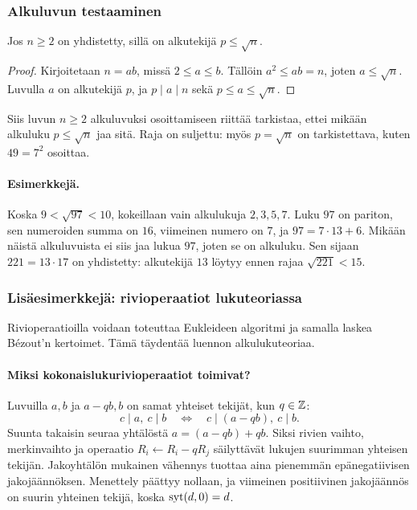 \documentclass[11pt,a4paper]{amsart}
\begin{document}
\subsubsection{Alkuluvun testaaminen}
\begin{lemma}[Neliöjuuriraja]
  Jos $n\ge2$ on yhdistetty, sillä on alkutekijä $p\le\sqrt n$.
\end{lemma}
\begin{proof}
  Kirjoitetaan $n=ab$, missä $2\le a\le b$. Tällöin $a^2\le ab=n$,
  joten $a\le\sqrt n$. Luvulla $a$ on alkutekijä $p$, ja
  $p\mid a\mid n$ sekä $p\le a\le\sqrt n$.
\end{proof}
Siis luvun $n\ge2$ alkuluvuksi osoittamiseen riittää tarkistaa,
ettei mikään alkuluku $p\le\sqrt n$ jaa sitä. Raja on suljettu:
myös $p=\sqrt n$ on tarkistettava, kuten $49=7^2$ osoittaa.

\paragraph{Esimerkkejä.}
Koska $9<\sqrt{97}<10$, kokeillaan vain alkulukuja $2,3,5,7$.
Luku $97$ on pariton, sen numeroiden summa on $16$, viimeinen numero
on $7$, ja $97=7\cdot13+6$. Mikään näistä alkuluvuista ei siis jaa
lukua $97$, joten se on alkuluku.
Sen sijaan $221=13\cdot17$ on yhdistetty: alkutekijä $13$ löytyy
ennen rajaa $\sqrt{221}<15$.

\newpage
\subsubsection{Lisäesimerkkejä: rivioperaatiot lukuteoriassa}
Rivioperaatioilla voidaan toteuttaa Eukleideen algoritmi ja samalla
laskea Bézout'n kertoimet. Tämä täydentää luennon alkulukuteoriaa.

\paragraph{Miksi kokonaislukurivioperaatiot toimivat?}
Luvuilla $a,b$ ja $a-qb,b$ on samat yhteiset tekijät, kun $q\in\mathbb{Z}$:
\[
  c\mid a,\ c\mid b
  \quad\Longleftrightarrow\quad
  c\mid(a-qb),\ c\mid b.
\]
Suunta takaisin seuraa yhtälöstä $a=(a-qb)+qb$.
Siksi rivien vaihto, merkinvaihto ja operaatio
$R_i\leftarrow R_i-qR_j$ säilyttävät lukujen suurimman yhteisen tekijän.
Jakoyhtälön mukainen vähennys tuottaa aina pienemmän epänegatiivisen
jakojäännöksen. Menettely päättyy nollaan, ja viimeinen positiivinen
jakojäännös on suurin yhteinen tekijä, koska $\operatorname{syt}(d,0)=d$.
\end{document}
